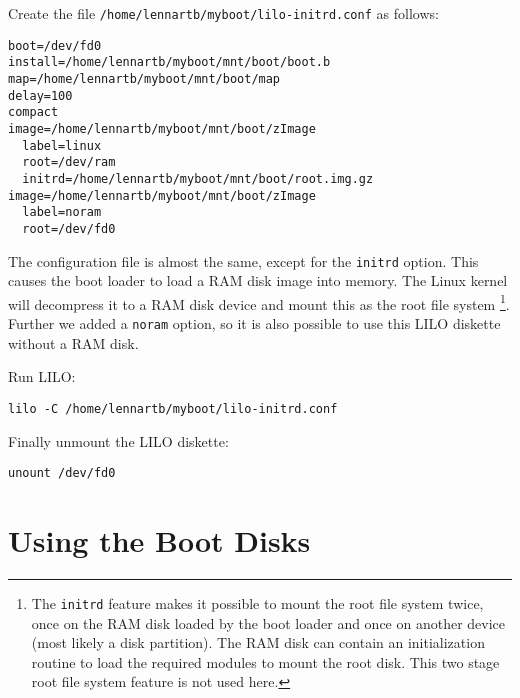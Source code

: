 \documentclass[12pt,a4paper]{article}
\begin{document}
Create the file {\tt /home/lennartb/myboot/lilo-initrd.conf} as follows:
\begin{verbatim}
boot=/dev/fd0
install=/home/lennartb/myboot/mnt/boot/boot.b
map=/home/lennartb/myboot/mnt/boot/map
delay=100
compact
image=/home/lennartb/myboot/mnt/boot/zImage
  label=linux
  root=/dev/ram
  initrd=/home/lennartb/myboot/mnt/boot/root.img.gz
image=/home/lennartb/myboot/mnt/boot/zImage
  label=noram
  root=/dev/fd0
\end{verbatim}
The configuration file is almost the same, except for the {\tt initrd}
option. This causes the boot loader to load a RAM disk image into
memory. The Linux kernel will decompress it to a RAM disk device and
mount this as the root file system \footnote{The {\tt initrd} feature
  makes it possible to mount the root file system twice, once on the
  RAM disk loaded by the boot loader and once on another device (most
  likely a disk partition). The RAM disk can contain an initialization
  routine to load the required modules to mount the root disk. This
  two stage root file system feature is not used here.}.
Further we added a {\tt noram} option, so it is also possible to use this
LILO diskette without a RAM disk.

Run LILO:
\begin{verbatim}
lilo -C /home/lennartb/myboot/lilo-initrd.conf
\end{verbatim}

Finally unmount the LILO diskette:
\begin{verbatim}
unount /dev/fd0
\end{verbatim}

\section{Using the Boot Disks}
\end{document}
